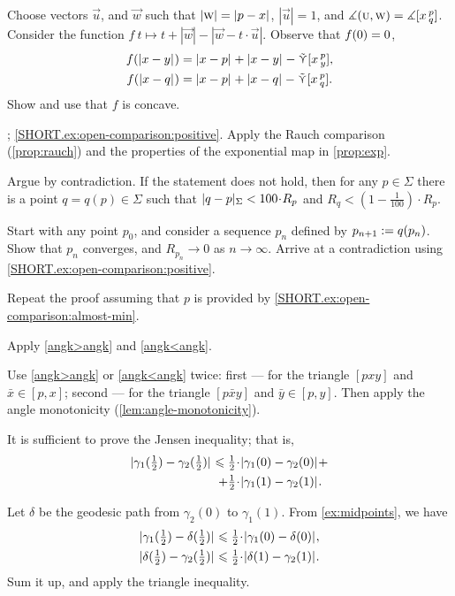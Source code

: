 \begin{multicols}{2}
Choose vectors $\vec u$, and $\vec w$ 
such that $|\vec w|\z=\dist{p}{x}{}$, $|\vec u|=1$, and $\measuredangle(\text{\sc{u}},\text{\sc{w}})=\measuredangle[x\,{}^{p}_{q}]$.
Consider the function
$f\:t\mapsto t+|\vec w|-|\vec w-t\cdot \vec u|$.
Observe that $f(0)\z=0$,
\begin{align*}
f(\dist{x}{y}{})&=\dist{x}{p}{}+\dist{x}{y}{}-\side\hinge xpy,
\\
f(\dist{x}{q}{})&=\dist{x}{p}{}+\dist{x}{q}{}-\side\hinge xpq.
\end{align*}
Show and use that $f$ is concave.

\parbf{\ref{ex:open-comparison}}; \ref{SHORT.ex:open-comparison:positive}.
Apply the Rauch comparison (\ref{prop:rauch}) and the properties of the exponential map in \ref{prop:exp}.

 Argue by contradiction.
If the statement does not hold, then for any $p\in\Sigma$ there is a point $q=q(p)\in \Sigma$ such that 
$\dist{q}{p}\Sigma< 100\cdot R_p$
and
$R_q<(1-\tfrac1{100})\cdot R_p$.

Start with any point $p_0$, and consider a sequence $p_n$ defined by $p_{n+1}\z\df q(p_n)$.
Show that $p_n$ converges, and $R_{p_n}\to 0$ as $n\to\infty$.
Arrive at a contradiction using \ref{SHORT.ex:open-comparison:positive}.

 Repeat the proof assuming that $p$ is provided by \ref{SHORT.ex:open-comparison:almost-min}.

Apply \ref{angk>angk} and \ref{angk<angk}.

 Use \ref{angk>angk} or \ref{angk<angk} twice:
first --- for the triangle $[pxy]$ and $\bar x\in [p,x]$;
second --- for the triangle $[p\bar xy]$ and $\bar y\in [p,y]$.
Then apply the angle monotonicity (\ref{lem:angle-monotonicity}).

It is sufficient to prove the Jensen inequality;
that is, 
\begin{align*}
\dist{\gamma_1(\tfrac12)}{\gamma_2(\tfrac12)}{}
\le
\tfrac12\cdot&\dist{\gamma_1(0)}{\gamma_2(0)}{}
+
\\
+
\tfrac12\cdot&\dist{\gamma_1(1)}{\gamma_2(1)}{}.
\end{align*}

Let $\delta$ be the geodesic path from $\gamma_2(0)$ to $\gamma_1(1)$.
From \ref{ex:midpoints}, we have
\begin{align*}
\dist{\gamma_1(\tfrac12)}{\delta(\tfrac12)}{}
&\le
\tfrac12\cdot\dist{\gamma_1(0)}{\delta(0)}{},
\\
\dist{\delta(\tfrac12)}{\gamma_2(\tfrac12)}{}
&\le
\tfrac12\cdot\dist{\delta(1)}{\gamma_2(1)}{}.
\end{align*}
Sum it up, and apply the triangle inequality.


\end{multicols}
